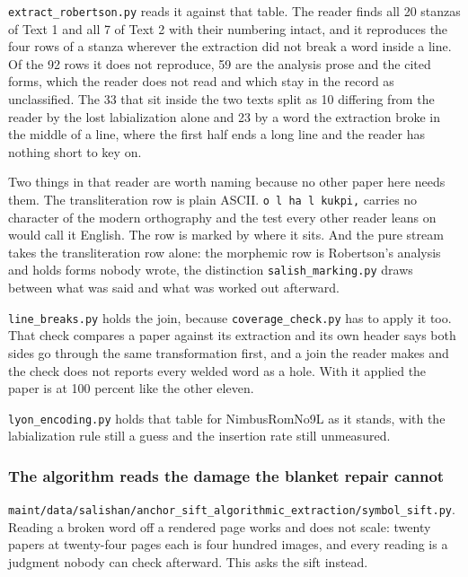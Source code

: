 \texttt{extract\_\allowbreak{}robertson.\allowbreak{}py} reads it against that table. The reader finds all 20 stanzas of Text 1 and all 7 of Text 2 with their numbering intact, and it reproduces the four rows of a stanza wherever the extraction did not break a word inside a line. Of the 92 rows it does not reproduce, 59 are the analysis prose and the cited forms, which the reader does not read and which stay in the record as unclassified. The 33 that sit inside the two texts split as 10 differing from the reader by the lost labialization alone and 23 by a word the extraction broke in the middle of a line, where the first half ends a long line and the reader has nothing short to key on.

Two things in that reader are worth naming because no other paper here needs them. The transliteration row is plain ASCII. \texttt{o l ha l kukpi,} carries no character of the modern orthography and the test every other reader leans on would call it English. The row is marked by where it sits. And the pure stream takes the transliteration row alone: the morphemic row is Robertson's analysis and holds forms nobody wrote, the distinction \texttt{salish\_\allowbreak{}marking.\allowbreak{}py} draws between what was said and what was worked out afterward.

\texttt{line\_\allowbreak{}breaks.\allowbreak{}py} holds the join, because \texttt{coverage\_\allowbreak{}check.\allowbreak{}py} has to apply it too. That check compares a paper against its extraction and its own header says both sides go through the same transformation first, and a join the reader makes and the check does not reports every welded word as a hole. With it applied the paper is at 100 percent like the other eleven.

\texttt{lyon\_\allowbreak{}encoding.\allowbreak{}py} holds that table for NimbusRomNo9L as it stands, with the labialization rule still a guess and the insertion rate still unmeasured.

\subsubsection{The algorithm reads the damage the blanket repair cannot}

\texttt{maint/\allowbreak{}data/\allowbreak{}salishan/\allowbreak{}anchor\_\allowbreak{}sift\_\allowbreak{}algorithmic\_\allowbreak{}extraction/\allowbreak{}symbol\_\allowbreak{}sift.\allowbreak{}py}. Reading a broken word off a rendered page works and does not scale: twenty papers at twenty-four pages each is four hundred images, and every reading is a judgment nobody can check afterward. This asks the sift instead.

